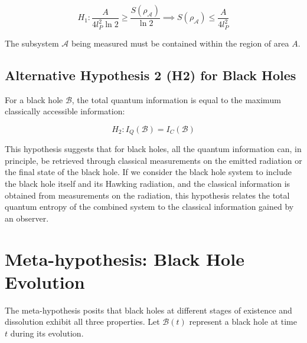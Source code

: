 \documentclass{article}
\begin{document}
	\begin{equation*}
		H_1: \frac{A}{4 l_P^2 \ln 2} \ge \frac{S(\rho_{\mathcal{A}})}{\ln 2} \implies S(\rho_{\mathcal{A}}) \le \frac{A}{4 l_P^2}
	\end{equation*}
	
	The subsystem $\mathcal{A}$ being measured must be contained within the region of area $A$.
	
	\subsection{Alternative Hypothesis 2 (H2) for Black Holes}
	
	For a black hole $\mathcal{B}$, the total quantum information is equal to the maximum classically accessible information:
	
	\begin{equation*}
		H_2: I_Q(\mathcal{B}) = I_C(\mathcal{B})
	\end{equation*}
	
	This hypothesis suggests that for black holes, all the quantum information can, in principle, be retrieved through classical measurements on the emitted radiation or the final state of the black hole. If we consider the black hole system to include the black hole itself and its Hawking radiation, and the classical information is obtained from measurements on the radiation, this hypothesis relates the total quantum entropy of the combined system to the classical information gained by an observer.
	
	\section{Meta-hypothesis: Black Hole Evolution}
	
	The meta-hypothesis posits that black holes at different stages of existence and dissolution exhibit all three properties. Let $\mathcal{B}(t)$ represent a black hole at time $t$ during its evolution.
	
\end{document}
